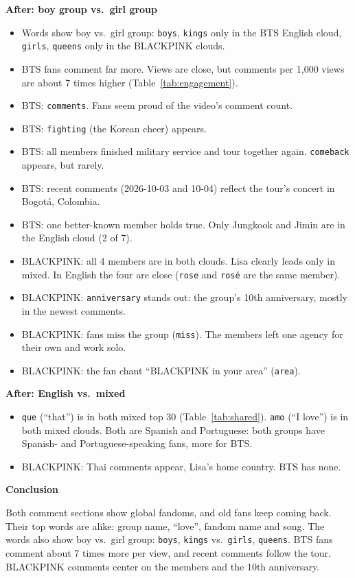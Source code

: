 \documentclass[11pt]{article}
\begin{document}
\textbf{After: boy group vs.\ girl group}
\begin{itemize}
  \item Words show boy vs.\ girl group: \texttt{boys}, \texttt{kings} only in the BTS English cloud, \texttt{girls}, \texttt{queens} only in the BLACKPINK clouds.
  \item BTS fans comment far more. Views are close, but comments per 1,000 views are about 7 times higher (Table~\ref{tab:engagement}).
  \item BTS: \texttt{comments}. Fans seem proud of the video's comment count.
  \item BTS: \texttt{fighting} (the Korean cheer) appears.
  \item BTS: all members finished military service and tour together again. \texttt{comeback} appears, but rarely.
  \item BTS: recent comments (2026-10-03 and 10-04) reflect the tour's concert in Bogotá, Colombia.
  \item BTS: one better-known member holds true. Only Jungkook and Jimin are in the English cloud (2 of 7).
  \item BLACKPINK: all 4 members are in both clouds. Lisa clearly leads only in mixed. In English the four are close (\texttt{rose} and \texttt{rosé} are the same member).
  \item BLACKPINK: \texttt{anniversary} stands out: the group's 10th anniversary, mostly in the newest comments.
  \item BLACKPINK: fans miss the group (\texttt{miss}). The members left one agency for their own and work solo.
  \item BLACKPINK: the fan chant ``BLACKPINK in your area'' (\texttt{area}).
\end{itemize}

\textbf{After: English vs.\ mixed}
\begin{itemize}
  \item \texttt{que} (``that'') is in both mixed top 30 (Table~\ref{tab:shared}). \texttt{amo} (``I love'') is in both mixed clouds. Both are Spanish and Portuguese: both groups have Spanish- and Portuguese-speaking fans, more for BTS.
  \item BLACKPINK: Thai comments appear, Lisa's home country. BTS has none.
\end{itemize}

\textbf{Conclusion}

Both comment sections show global fandoms, and old fans keep coming back.
Their top words are alike: group name, ``love'', fandom name and song.
The words also show boy vs.\ girl group: \texttt{boys}, \texttt{kings} vs.\ \texttt{girls}, \texttt{queens}.
BTS fans comment about 7 times more per view, and recent comments follow the tour.
BLACKPINK comments center on the members and the 10th anniversary.
\end{document}
